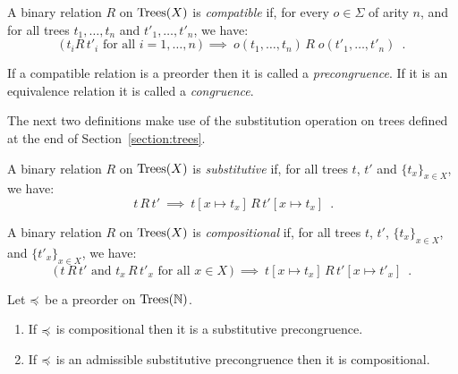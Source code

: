 \begin{definition}[Compatibility]
    A binary relation $R$ on $\textnormal{Trees}(X)$ is  \emph{compatible} if,
    for every $o \in \Sigma$ of arity $n$, and for all trees 
     $t_1,\dots, t_n$ and $t'_1, \dots, t'_n$, we have:
    \[ \text{($\,t_i  R \, t'_i$ for all $i = 1, \dots, n\,$)} ~ \implies ~ 
        o(t_1, \dots, t_n) \, R \; o(t'_1, \dots, t'_n) \enspace .
    \]
\end{definition}
If a compatible relation is a preorder then it is called a \emph{precongruence}. If it is an equivalence relation it is called a \emph{congruence}.

\noindent
The next two definitions make use of the substitution operation on trees defined at the end of
Section~\ref{section:trees}.
\begin{definition}[Substitutive]
    A binary relation $R$ on $\textnormal{Trees}(X)$ is  \emph{substitutive} if,
    for all trees $t$, $t'$ and $\{t_x\}_{x \in X}$, we have:
    \[ \text{$\,t\, R \, t'$} ~ \implies ~ 
       t[ x \mapsto t_x] \, R \, t'[ x \mapsto t_x] \enspace .
    \]
\end{definition}



\begin{definition}[Compositionality]
    A binary relation $R$ on $\textnormal{Trees}(X)$ is \emph{compositional} if, for all 
    trees $t$, $t'$,  $\{t_x\}_{x \in X}$,  and $\{t'_x\}_{x \in X}$, we have:
        \[ \text{($\,t \, R \, t'$ and $t_x \, R \, t'_x$ for all $x \in X\,$)} ~ \implies ~ 
        t[ x \mapsto t_x] \, R \, t'[ x \mapsto t'_x] \enspace .
    \]
\end{definition}



\begin{proposition} Let $\preccurlyeq$ be a preorder  on $\textnormal{Trees}(\mathbb{N})$.
\begin{enumerate} 
\item If  $\preccurlyeq$ is compositional then it is a substitutive precongruence.
\item If $\preccurlyeq$ is an admissible substitutive precongruence then it is compositional.
\end{enumerate}
\end{proposition}

